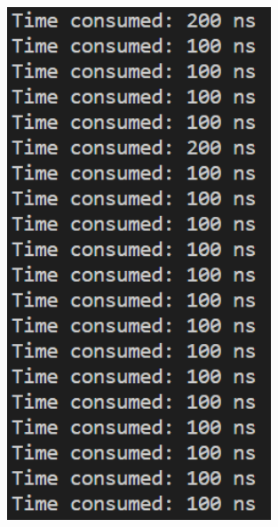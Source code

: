 \documentclass[a4paper,12pt]{article}
\begin{document}
\begin{figure}[H]
{\begin{minipage}[t]{0.4\textwidth}
        \includegraphics[width = 0.7\textwidth]{N = 160, Asm optimization.png}
    \end{minipage}}
\end{figure}
\end{document}
